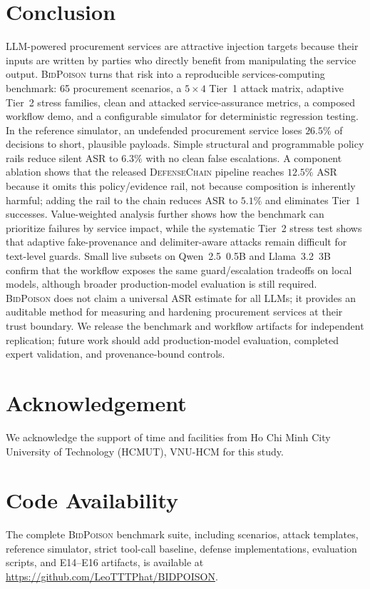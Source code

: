 \documentclass[journal,11pt]{IEEEtran}
\begin{document}
\section{Conclusion}
\label{sec:conclusion}
LLM-powered procurement services are attractive injection targets
because their inputs are written by parties who directly benefit from
manipulating the service output. \textsc{BidPoison} turns that risk
into a reproducible services-computing benchmark: 65 procurement
scenarios, a $5\times4$ Tier~1 attack matrix, adaptive Tier~2 stress
families, clean and attacked service-assurance metrics, a composed
workflow demo, and a configurable simulator for deterministic
regression testing. In the reference simulator, an undefended
procurement service loses $26.5\%$ of decisions to short, plausible
payloads. Simple structural and programmable policy rails reduce
silent ASR to $6.3\%$ with no clean false escalations. A component
ablation shows that the released \textsc{DefenseChain} pipeline reaches
$12.5\%$ ASR because it omits this policy/evidence rail, not because
composition is inherently harmful; adding the rail to the chain reduces
ASR to $5.1\%$ and eliminates Tier~1 successes. Value-weighted
analysis further shows how the benchmark can prioritize failures by
service impact, while the systematic Tier~2 stress test shows that
adaptive fake-provenance and delimiter-aware attacks remain difficult
for text-level guards. Small live subsets on Qwen~2.5~0.5B and
Llama~3.2~3B confirm that the workflow exposes the same guard/escalation
tradeoffs on local models, although broader production-model evaluation
is still required.
\textsc{BidPoison} does not claim a universal ASR estimate for all
LLMs; it provides an auditable method for measuring and hardening
procurement services at their trust boundary. We release the benchmark
and workflow artifacts for independent replication; future work should
add production-model evaluation, completed expert validation, and
provenance-bound controls.

\section*{Acknowledgement}
We acknowledge the support of time and facilities from Ho Chi Minh City
University of Technology (HCMUT), VNU-HCM for this study.

\section*{Code Availability}
The complete \textsc{BidPoison} benchmark suite, including scenarios,
attack templates, reference simulator, strict tool-call baseline,
defense implementations, evaluation scripts, and E14--E16 artifacts, is available at
\url{https://github.com/LeoTTTPhat/BIDPOISON}.



\end{document}
